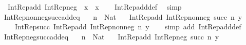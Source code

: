 \begin{isabellebody}
\ \ {\isachardoublequoteopen}Int{\isacharunderscore}{\kern0pt}Rep{\isacharunderscore}{\kern0pt}add\ {\isacharparenleft}{\kern0pt}Int{\isacharunderscore}{\kern0pt}Rep{\isacharunderscore}{\kern0pt}neg\ {}{\isacharparenright}{\kern0pt}\ x\ {\isacharequal}{\kern0pt}\ x{\isachardoublequoteclose}\isanewline
%
\isadelimproof
\ \ %
\endisadelimproof
%
\isatagproof
{}\isamarkupfalse%
\ Int{\isacharunderscore}{\kern0pt}Rep{\isacharunderscore}{\kern0pt}add{\isacharunderscore}{\kern0pt}def\ \isamarkupfalse%
\ simp%
\endisatagproof
{\isafoldproof}%
%
\isadelimproof
\isanewline
%
\endisadelimproof
\isanewline
{}\isamarkupfalse%
\ Int{\isacharunderscore}{\kern0pt}Rep{\isacharunderscore}{\kern0pt}nonneg{\isacharunderscore}{\kern0pt}succ{\isacharunderscore}{\kern0pt}add{\isacharunderscore}{\kern0pt}eq{\isacharcolon}{\kern0pt}\isanewline
\ \ \ {\isachardoublequoteopen}n\ {\isacharcolon}{\kern0pt}\ Nat{\isachardoublequoteclose}\isanewline
\ \ \ {\isachardoublequoteopen}Int{\isacharunderscore}{\kern0pt}Rep{\isacharunderscore}{\kern0pt}add\ {\isacharparenleft}{\kern0pt}Int{\isacharunderscore}{\kern0pt}Rep{\isacharunderscore}{\kern0pt}nonneg\ {\isacharparenleft}{\kern0pt}succ\ n{\isacharparenright}{\kern0pt}{\isacharparenright}{\kern0pt}\ y\ {\isacharequal}{\kern0pt}\isanewline
\ \ \ \ Int{\isacharunderscore}{\kern0pt}Rep{\isacharunderscore}{\kern0pt}succ\ {\isacharparenleft}{\kern0pt}Int{\isacharunderscore}{\kern0pt}Rep{\isacharunderscore}{\kern0pt}add\ {\isacharparenleft}{\kern0pt}Int{\isacharunderscore}{\kern0pt}Rep{\isacharunderscore}{\kern0pt}nonneg\ n{\isacharparenright}{\kern0pt}\ y{\isacharparenright}{\kern0pt}{\isachardoublequoteclose}\isanewline
%
\isadelimproof
\ \ %
\endisadelimproof
%
\isatagproof
{}\isamarkupfalse%
\ {\isacharparenleft}{\kern0pt}simp\ add{\isacharcolon}{\kern0pt}\ Int{\isacharunderscore}{\kern0pt}Rep{\isacharunderscore}{\kern0pt}add{\isacharunderscore}{\kern0pt}def{\isacharparenright}{\kern0pt}%
\endisatagproof
{\isafoldproof}%
%
\isadelimproof
\isanewline
%
\endisadelimproof
\isanewline
{}\isamarkupfalse%
\ Int{\isacharunderscore}{\kern0pt}Rep{\isacharunderscore}{\kern0pt}neg{\isacharunderscore}{\kern0pt}succ{\isacharunderscore}{\kern0pt}add{\isacharunderscore}{\kern0pt}eq{\isacharcolon}{\kern0pt}\isanewline
\ \ \ {\isachardoublequoteopen}n\ {\isacharcolon}{\kern0pt}\ Nat{\isachardoublequoteclose}\isanewline
\ \ \ {\isachardoublequoteopen}Int{\isacharunderscore}{\kern0pt}Rep{\isacharunderscore}{\kern0pt}add\ {\isacharparenleft}{\kern0pt}Int{\isacharunderscore}{\kern0pt}Rep{\isacharunderscore}{\kern0pt}neg\ {\isacharparenleft}{\kern0pt}succ\ n{\isacharparenright}{\kern0pt}{\isacharparenright}{\kern0pt}\ y\ {\isacharequal}{\kern0pt}\isanewline

\end{isabellebody}

